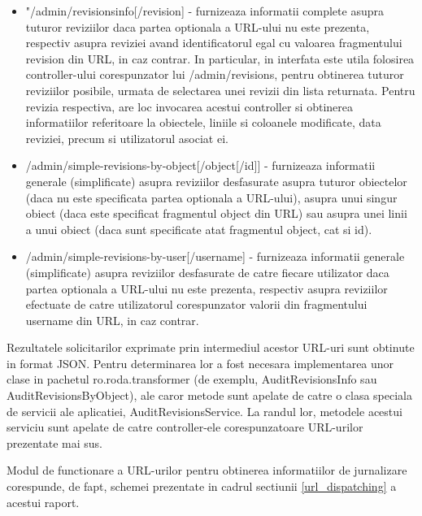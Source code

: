 \begin{itemize}
\item{"/admin/revisionsinfo[/{revision}] - furnizeaza informatii complete asupra tuturor reviziilor daca partea optionala a URL-ului nu este prezenta, respectiv asupra reviziei avand identificatorul egal cu valoarea fragmentului revision din URL, in caz contrar. In particular, in interfata este utila folosirea controller-ului corespunzator lui /admin/revisions, pentru obtinerea tuturor reviziilor posibile, urmata de selectarea unei revizii din lista returnata. Pentru revizia respectiva, are loc invocarea acestui controller si obtinerea informatiilor referitoare la obiectele, liniile si coloanele modificate, data reviziei, precum si utilizatorul asociat ei.}
\item{/admin/simple-revisions-by-object[/{object}[/{id}]] - furnizeaza informatii generale (simplificate) asupra reviziilor desfasurate asupra tuturor obiectelor (daca nu este specificata partea optionala a URL-ului), asupra unui singur obiect (daca este specificat fragmentul object din URL) sau asupra unei linii a unui obiect (daca sunt specificate atat fragmentul object, cat si id).}
\item{/admin/simple-revisions-by-user[/{username}] - furnizeaza informatii generale (simplificate) asupra reviziilor desfasurate de catre fiecare utilizator daca partea optionala a URL-ului nu este prezenta, respectiv asupra reviziilor efectuate de catre utilizatorul corespunzator valorii din fragmentului username din URL, in caz contrar.}
\end{itemize}

Rezultatele solicitarilor exprimate prin intermediul acestor URL-uri sunt obtinute in format JSON. Pentru determinarea lor a fost necesara implementarea unor clase in pachetul ro.roda.transformer (de exemplu, AuditRevisionsInfo sau AuditRevisionsByObject), ale caror metode sunt apelate de catre o clasa speciala de servicii ale aplicatiei, AuditRevisionsService. La randul lor, metodele acestui serviciu sunt apelate de catre controller-ele corespunzatoare URL-urilor prezentate mai sus. 

Modul de functionare a URL-urilor pentru obtinerea informatiilor de jurnalizare corespunde, de fapt, schemei prezentate in cadrul sectiunii \ref{url_dispatching} a acestui raport.




